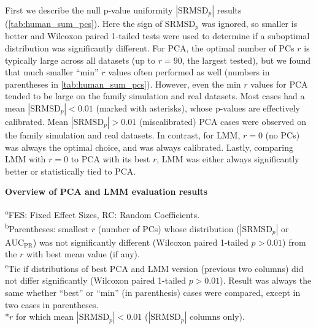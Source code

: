 \documentclass[11pt]{article}
\newcommand{\rmsd}{\text{SRMSD}_p}
\newcommand{\auc}{\text{AUC}_\text{PR}}
\begin{document}
First we describe the null p-value uniformity $|\rmsd|$ results (\cref{tab:human_sum_pcs}).
Here the sign of $\rmsd$ was ignored, so smaller is better and Wilcoxon paired 1-tailed tests were used to determine if a suboptimal distribution was significantly different.
For PCA, the optimal number of PCs $r$ is typically large across all datasets (up to $r=90$, the largest tested), but we found that much smaller ``min'' $r$ values often performed as well (numbers in parentheses in \cref{tab:human_sum_pcs}).
However, even the min $r$ values for PCA tended to be large on the family simulation and real datasets.
Most cases had a mean $|\rmsd| < 0.01$ (marked with asterisks), whose p-values are effectively calibrated.
Mean $|\rmsd| > 0.01$ (miscalibrated) PCA cases were observed on the family simulation and real datasets.
In contrast, for LMM, $r=0$ (no PCs) was always the optimal choice, and was always calibrated.
Lastly, comparing LMM with $r=0$ to PCA with its best $r$, LMM was either always significantly better or statistically tied to PCA.

\begin{table}[hb!]
  \centering
  \caption{
    \textbf{Overview of PCA and LMM evaluation results}
  }
  \label{tab:human_sum_pcs}
  \csvreader[
  tabular = lc|ccc|ccc,
  separator = tab,
  table head = 
  \toprule & Metric: & \multicolumn{3}{c|}{$|\rmsd|$} & \multicolumn{3}{c}{$\auc$} \\
  \midrule & & \multicolumn{2}{c}{Best (min\textsuperscript{b}) PCs} & & \multicolumn{2}{c}{Best (min\textsuperscript{b}) PCs} & \\
  Dataset & {Trait model\textsuperscript{a}} & PCA & LMM & {Best\textsuperscript{c}} & PCA & LMM & {Best\textsuperscript{c}} \\\midrule,
  late after last line = \\\bottomrule
  ]{../data/stats.txt}{}{\csvlinetotablerow}
  \begin{flushleft}
    \textsuperscript{a}FES: Fixed Effect Sizes, RC: Random Coefficients.\\
    \textsuperscript{b}Parentheses: smallest $r$ (number of PCs) whose distribution ($|\rmsd|$ or $\auc$) was not significantly different (Wilcoxon paired 1-tailed $p > 0.01$) from the $r$ with best mean value (if any). \\
    \textsuperscript{c}Tie if distributions of best PCA and LMM version (previous two columns) did not differ significantly (Wilcoxon paired 1-tailed $p > 0.01$).
    Result was always the same whether ``best'' or ``min'' (in parenthesis) cases were compared, except in two cases in parentheses.\\
    *$r$ for which mean $|\rmsd| < 0.01$ ($|\rmsd|$ columns only).
  \end{flushleft}
\end{table}
\end{document}
